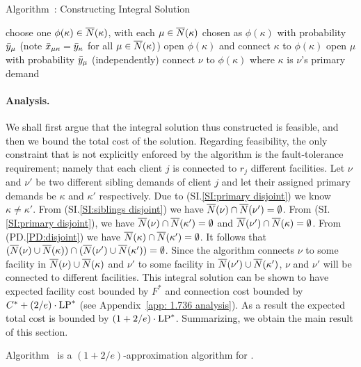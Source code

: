 \documentclass[11pt]{article}
\begin{document}
\begin{algorithm}
  \caption{Algorithm~{\ECHS}:
    Constructing Integral Solution}
  \label{alg:lpr3}
  \begin{algorithmic}[1]
    \State choose one $\phi(\kappa)\in {\overline{N}}(\kappa)$,
    with each $\mu\in{\overline{N}}(\kappa)$ chosen as $\phi(\kappa)$
    with probability ${\bar y}_\mu$ (note {${\bar x}_{\mu\kappa} =
      {\bar y}_{\kappa}$ for all $\mu \in {\overline{N}}(\kappa)$})
    \State open $\phi(\kappa)$ and connect $\kappa$ to $\phi(\kappa)$
    \EndFor
    \State open $\mu$ with probability ${\bar y}_\mu$ (independently)
    \EndFor
    \Else
    \State connect $\nu$ to $\phi(\kappa)$ where $\kappa$ is $\nu$'s
     primary demand
    \EndIf
    \EndFor
  \end{algorithmic}
\end{algorithm}


\paragraph{Analysis.}
We shall first argue that the integral solution thus constructed is
feasible, and then we bound the total cost of the solution. Regarding
feasibility, the only constraint that is not explicitly enforced by
the algorithm is the fault-tolerance requirement; namely that each
client $j$ is connected to $r_j$ different facilities. Let $\nu$ and
$\nu'$ be two different sibling demands of client $j$ and let their
assigned primary demands be $\kappa$ and $\kappa'$ respectively. Due
to (SI.\ref{SI:primary disjoint}) we know $\kappa \neq \kappa'$. From
(SI.\ref{SI:siblings disjoint}) we have ${\overline{N}}(\nu) \cap {\overline{N}}(\nu')
= \emptyset$. From (SI.\ref{SI:primary disjoint}), we have
${\overline{N}}(\nu) \cap {\overline{N}}(\kappa') = \emptyset$ and ${\overline{N}}(\nu') \cap
{\overline{N}}(\kappa) = \emptyset$. From (PD.\ref{PD:disjoint}) we have
${\overline{N}}(\kappa)\cap {\overline{N}}(\kappa') = \emptyset$. It follows that
$({\overline{N}}(\nu) \cup {\overline{N}}(\kappa)) \cap ({\overline{N}}(\nu') \cup
{\overline{N}}(\kappa')) = \emptyset$. Since the algorithm connects $\nu$ to
some facility in ${\overline{N}}(\nu) \cup {\overline{N}}(\kappa)$ and $\nu'$ to some
facility in ${\overline{N}}(\nu') \cup {\overline{N}}(\kappa')$, $\nu$ and $\nu'$ will
be connected to different facilities. This integral solution can be
shown to have expected facility cost bounded by $F^\ast$ and
connection cost bounded by $C^\ast + (2/e)\cdot \mbox{\rm LP}^\ast$ (see
Appendix~\ref{app: 1.736 analysis}). As a result the expected total
cost is bounded by $(1 + 2/e)\cdot \mbox{\rm LP}^\ast$. Summarizing, we obtain
the main result of this section.
\begin{theorem}\label{thm:1736}
  Algorithm~{\ECHS} is a $(1+2/e)$-approximation algorithm for \FTFP.
\end{theorem}
\end{document}
